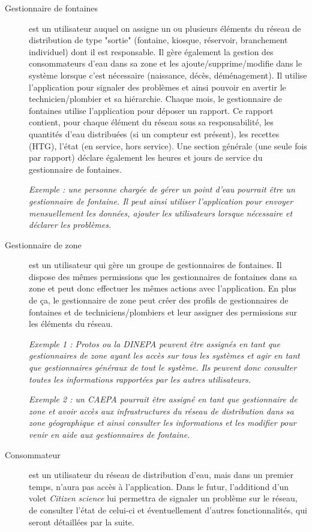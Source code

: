 \documentclass[a4paper, 11pt]{article}
\begin{document}
  \begin{description}
    \item[Gestionnaire de fontaines] est un utilisateur auquel on assigne un ou plusieurs éléments du réseau de distribution de type "sortie" (fontaine, kiosque, réservoir, branchement individuel) dont il est responsable.
    Il gère également la gestion des consommateurs d'eau dans sa zone et les ajoute/supprime/modifie dans le système lorsque c'est nécessaire (naissance, décès, déménagement).
    Il utilise l'application pour signaler des problèmes et ainsi pouvoir en avertir le technicien/plombier et sa hiérarchie. Chaque mois, le gestionnaire de fontaines utilise l'application pour déposer un rapport. Ce rapport contient, pour chaque élément du réseau sous sa responsabilité, les quantités d'eau distribuées (si un compteur est présent), les recettes (HTG), l'état (en service, hors service). Une section générale (une seule fois par rapport) déclare également les heures et jours de service du gestionnaire de fontaines.

    \emph{Exemple : une personne chargée de gérer un point d'eau pourrait être un gestionnaire de fontaine. Il peut ainsi utiliser l'application pour envoyer mensuellement les données, ajouter les utilisateurs lorsque nécessaire et déclarer les problèmes.}

    \item[Gestionnaire de zone] est un utilisateur qui gère un groupe de gestionnaires de fontaines. Il dispose des mêmes permissions que les gestionnaires de fontaines dans sa zone et peut donc effectuer les mêmes actions avec l'application. En plus de ça, le gestionnaire de zone peut créer des profils de gestionnaires de fontaines et de techniciens/plombiers et leur assigner des permissions sur les éléments du réseau. %

    \emph{Exemple 1 : Protos ou la DINEPA peuvent être assignés en tant que gestionnaires de zone ayant les accès sur tous les systèmes et agir en tant que gestionnaires généraux de tout le système. Ils peuvent donc consulter toutes les informations rapportées par les autres utilisateurs.}

    \emph{Exemple 2 : un CAEPA pourrait être assigné en tant que gestionnaire de zone et avoir accès aux infrastructures du réseau de distribution dans sa zone géographique et ainsi consulter les informations et les modifier pour venir en aide aux gestionnaires de fontaine.}

    \item[Consommateur] est un utilisateur du réseau de distribution d'eau, mais dans un premier temps, n'aura pas accès à l'application. Dans le futur, l'additiond d'un volet \emph{Citizen science} lui permettra de signaler un problème sur le réseau, de consulter l'état de celui-ci et éventuellement d'autres fonctionnalités, qui seront détaillées par la suite.


\end{description}
\end{document}

